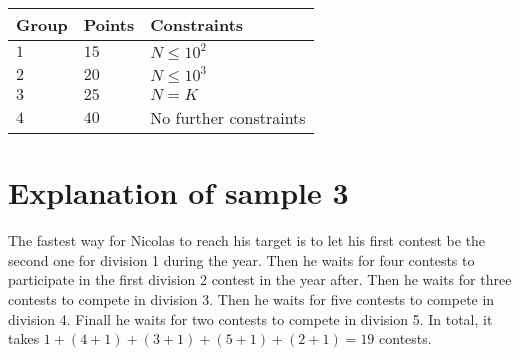 \noindent
\begin{tabular}{| l | l | l |}
\hline
Group & Points & Constraints \\ \hline
$1$    & $15$         & $N \leq 10^2$ \\ \hline
$2$    & $20$         & $N \leq 10^3$ \\ \hline
$3$    & $25$         & $N = K$ \\ \hline
$4$    & $40$         & No further constraints\\ \hline
\end{tabular}

\section*{Explanation of sample 3}
The fastest way for Nicolas to reach his target is to let his first contest be the second one for division 1 during the year.
Then he waits for four contests to participate in the first division 2 contest in the year after.
Then he waits for three contests to compete in division 3.
Then he waits for five contests to compete in division 4.
Finall he waits for two contests to compete in division 5.
In total, it takes $1+(4+1)+(3+1)+(5+1)+(2+1) = 19$ contests.
